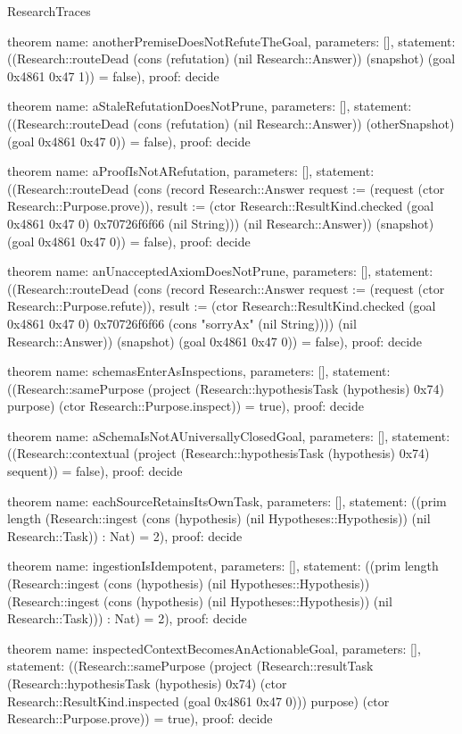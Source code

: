 \begin{lexlean}{ResearchTraces}
\begin{semanticmodule}
theorem{
  name: anotherPremiseDoesNotRefuteTheGoal,
  parameters: [],
  statement: ((Research::routeDead (cons (refutation) (nil Research::Answer)) (snapshot) (goal 0x4861 0x47 1)) = false),
  proof: decide{}
}

theorem{
  name: aStaleRefutationDoesNotPrune,
  parameters: [],
  statement: ((Research::routeDead (cons (refutation) (nil Research::Answer)) (otherSnapshot) (goal 0x4861 0x47 0)) = false),
  proof: decide{}
}

theorem{
  name: aProofIsNotARefutation,
  parameters: [],
  statement: ((Research::routeDead (cons (record Research::Answer {request := (request (ctor Research::Purpose.prove)), result := (ctor Research::ResultKind.checked (goal 0x4861 0x47 0) 0x70726f6f66 (nil String))}) (nil Research::Answer)) (snapshot) (goal 0x4861 0x47 0)) = false),
  proof: decide{}
}

theorem{
  name: anUnacceptedAxiomDoesNotPrune,
  parameters: [],
  statement: ((Research::routeDead (cons (record Research::Answer {request := (request (ctor Research::Purpose.refute)), result := (ctor Research::ResultKind.checked (goal 0x4861 0x47 0) 0x70726f6f66 (cons "sorryAx" (nil String)))}) (nil Research::Answer)) (snapshot) (goal 0x4861 0x47 0)) = false),
  proof: decide{}
}

theorem{
  name: schemasEnterAsInspections,
  parameters: [],
  statement: ((Research::samePurpose (project (Research::hypothesisTask (hypothesis) 0x74) purpose) (ctor Research::Purpose.inspect)) = true),
  proof: decide{}
}

theorem{
  name: aSchemaIsNotAUniversallyClosedGoal,
  parameters: [],
  statement: ((Research::contextual (project (Research::hypothesisTask (hypothesis) 0x74) sequent)) = false),
  proof: decide{}
}

theorem{
  name: eachSourceRetainsItsOwnTask,
  parameters: [],
  statement: ((prim length (Research::ingest (cons (hypothesis) (nil Hypotheses::Hypothesis)) (nil Research::Task)) : Nat) = 2),
  proof: decide{}
}

theorem{
  name: ingestionIsIdempotent,
  parameters: [],
  statement: ((prim length (Research::ingest (cons (hypothesis) (nil Hypotheses::Hypothesis)) (Research::ingest (cons (hypothesis) (nil Hypotheses::Hypothesis)) (nil Research::Task))) : Nat) = 2),
  proof: decide{}
}

theorem{
  name: inspectedContextBecomesAnActionableGoal,
  parameters: [],
  statement: ((Research::samePurpose (project (Research::resultTask (Research::hypothesisTask (hypothesis) 0x74) (ctor Research::ResultKind.inspected (goal 0x4861 0x47 0))) purpose) (ctor Research::Purpose.prove)) = true),
  proof: decide{}
}


\end{semanticmodule}
\end{lexlean}
